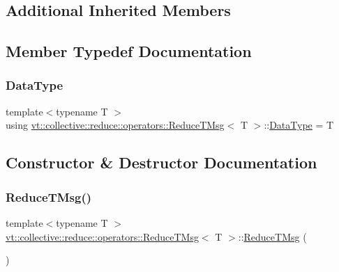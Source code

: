 \subsection*{Additional Inherited Members}


\subsection{Member Typedef Documentation}
\mbox{\label{structvt_1_1collective_1_1reduce_1_1operators_1_1_reduce_t_msg_ad9a7434e9e8b0afd4fcb13307058e698}} 
\subsubsection{\texorpdfstring{Data\+Type}{DataType}}
{\footnotesize\ttfamily template$<$typename T $>$ \\
using \hyperlink{structvt_1_1collective_1_1reduce_1_1operators_1_1_reduce_t_msg}{vt\+::collective\+::reduce\+::operators\+::\+Reduce\+T\+Msg}$<$ T $>$\+::\hyperlink{structvt_1_1collective_1_1reduce_1_1operators_1_1_reduce_t_msg_ad9a7434e9e8b0afd4fcb13307058e698}{Data\+Type} =  T}



\subsection{Constructor \& Destructor Documentation}
\mbox{\label{structvt_1_1collective_1_1reduce_1_1operators_1_1_reduce_t_msg_ab7705a9ce2e1c1702021fa2e79b81493}} 
\subsubsection{\texorpdfstring{Reduce\+T\+Msg()}{ReduceTMsg()}\hspace{0.1cm}{\footnotesize\ttfamily [1/3]}}
{\footnotesize\ttfamily template$<$typename T $>$ \\
\hyperlink{structvt_1_1collective_1_1reduce_1_1operators_1_1_reduce_t_msg}{vt\+::collective\+::reduce\+::operators\+::\+Reduce\+T\+Msg}$<$ T $>$\+::\hyperlink{structvt_1_1collective_1_1reduce_1_1operators_1_1_reduce_t_msg}{Reduce\+T\+Msg} (\begin{DoxyParamCaption}{ }\end{DoxyParamCaption})\hspace{0.3cm}{\ttfamily [default]}}

